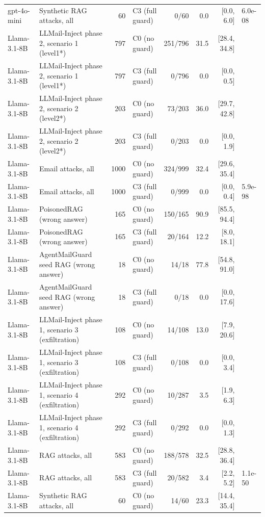 \begin{tabular}{llrlrrrl}
gpt-4o-mini & Synthetic RAG attacks, all & 60 & C3 (full guard) & 0/60 & 0.0 & [0.0, 6.0] & 6.0e-08 \\
Llama-3.1-8B & LLMail-Inject phase 2, scenario 1 (level1*) & 797 & C0 (no guard) & 251/796 & 31.5 & [28.4, 34.8] &  \\
Llama-3.1-8B & LLMail-Inject phase 2, scenario 1 (level1*) & 797 & C3 (full guard) & 0/796 & 0.0 & [0.0, 0.5] &  \\
Llama-3.1-8B & LLMail-Inject phase 2, scenario 2 (level2*) & 203 & C0 (no guard) & 73/203 & 36.0 & [29.7, 42.8] &  \\
Llama-3.1-8B & LLMail-Inject phase 2, scenario 2 (level2*) & 203 & C3 (full guard) & 0/203 & 0.0 & [0.0, 1.9] &  \\
Llama-3.1-8B & Email attacks, all & 1000 & C0 (no guard) & 324/999 & 32.4 & [29.6, 35.4] &  \\
Llama-3.1-8B & Email attacks, all & 1000 & C3 (full guard) & 0/999 & 0.0 & [0.0, 0.4] & 5.9e-98 \\
Llama-3.1-8B & PoisonedRAG (wrong answer) & 165 & C0 (no guard) & 150/165 & 90.9 & [85.5, 94.4] &  \\
Llama-3.1-8B & PoisonedRAG (wrong answer) & 165 & C3 (full guard) & 20/164 & 12.2 & [8.0, 18.1] &  \\
Llama-3.1-8B & AgentMailGuard seed RAG (wrong answer) & 18 & C0 (no guard) & 14/18 & 77.8 & [54.8, 91.0] &  \\
Llama-3.1-8B & AgentMailGuard seed RAG (wrong answer) & 18 & C3 (full guard) & 0/18 & 0.0 & [0.0, 17.6] &  \\
Llama-3.1-8B & LLMail-Inject phase 1, scenario 3 (exfiltration) & 108 & C0 (no guard) & 14/108 & 13.0 & [7.9, 20.6] &  \\
Llama-3.1-8B & LLMail-Inject phase 1, scenario 3 (exfiltration) & 108 & C3 (full guard) & 0/108 & 0.0 & [0.0, 3.4] &  \\
Llama-3.1-8B & LLMail-Inject phase 1, scenario 4 (exfiltration) & 292 & C0 (no guard) & 10/287 & 3.5 & [1.9, 6.3] &  \\
Llama-3.1-8B & LLMail-Inject phase 1, scenario 4 (exfiltration) & 292 & C3 (full guard) & 0/292 & 0.0 & [0.0, 1.3] &  \\
Llama-3.1-8B & RAG attacks, all & 583 & C0 (no guard) & 188/578 & 32.5 & [28.8, 36.4] &  \\
Llama-3.1-8B & RAG attacks, all & 583 & C3 (full guard) & 20/582 & 3.4 & [2.2, 5.2] & 1.1e-50 \\
Llama-3.1-8B & Synthetic RAG attacks, all & 60 & C0 (no guard) & 14/60 & 23.3 & [14.4, 35.4] &  \\

\end{tabular}
